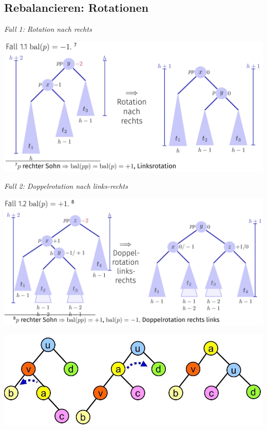 \begin{sectionbox}
\subsection{Rebalancieren: Rotationen}\smallskip
\textit{Fall 1: Rotation nach rechts}\par
\begin{center}
    \includegraphics[width = \columnwidth]{../img/rotR.png}
\end{center}\smallskip
\textit{Fall 2: Doppelrotation nach links-rechts}\par
\begin{center}
    \includegraphics[width = \columnwidth]{../img/rotLR.png} \par\smallskip
    \includegraphics[width = \columnwidth]{../img/Doppelrotationen.jpg}
\end{center}\smallskip
\end{sectionbox}

